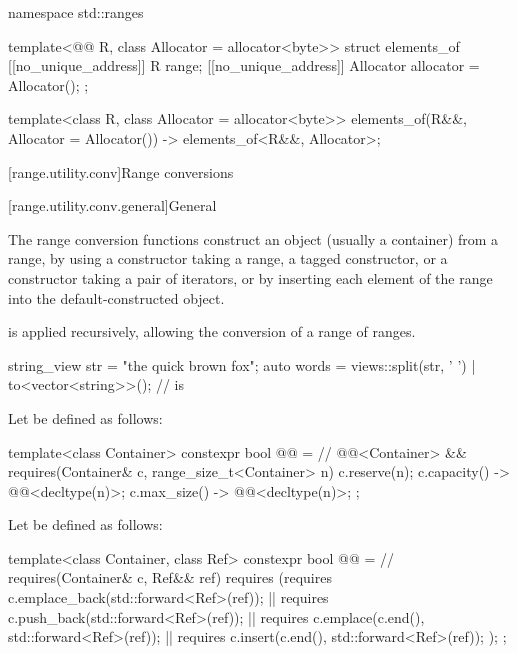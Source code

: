 \begin{codeblock}
namespace std::ranges {
  template<@@ R, class Allocator = allocator<byte>>
  struct elements_of {
    [[no_unique_address]] R range;
    [[no_unique_address]] Allocator allocator = Allocator();
  };

  template<class R, class Allocator = allocator<byte>>
    elements_of(R&&, Allocator = Allocator()) -> elements_of<R&&, Allocator>;
}
\end{codeblock}

[range.utility.conv]{Range conversions}

[range.utility.conv.general]{General}

\pnum
The range conversion functions construct
an object (usually a container) from a range,
by using a constructor taking a range,
a  tagged constructor, or
a constructor taking a pair of iterators, or
by inserting each element of the range into the default-constructed object.

\pnum
{} is applied recursively,
allowing the conversion of a range of ranges.

\begin{example}
\begin{codeblock}
string_view str = "the quick brown fox";
auto words = views::split(str, ' ') | to<vector<string>>();
//  is 
\end{codeblock}
\end{example}

\pnum
Let  be defined as follows:
\begin{codeblock}
template<class Container>
constexpr bool @@ =          // \expos
  @@<Container> &&
  requires(Container& c, range_size_t<Container> n) {
    c.reserve(n);
    { c.capacity() } -> @@<decltype(n)>;
    { c.max_size() } -> @@<decltype(n)>;
  };
\end{codeblock}

\pnum
Let  be defined as follows:
\begin{codeblock}
template<class Container, class Ref>
constexpr bool @@ =          // \expos
  requires(Container& c, Ref&& ref) {
    requires (requires { c.emplace_back(std::forward<Ref>(ref)); } ||
              requires { c.push_back(std::forward<Ref>(ref)); } ||
              requires { c.emplace(c.end(), std::forward<Ref>(ref)); } ||
              requires { c.insert(c.end(), std::forward<Ref>(ref)); });
  };
\end{codeblock}

